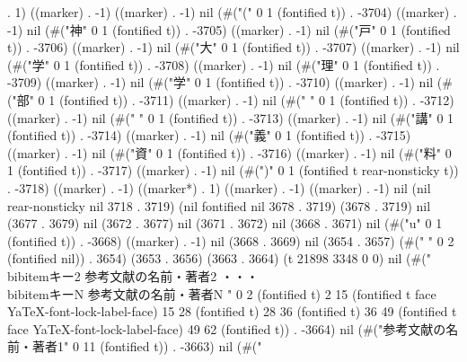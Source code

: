 . 1) ((marker) . -1) ((marker) . -1) nil (#("(" 0 1 (fontified t)) . -3704) ((marker) . -1) nil (#("神" 0 1 (fontified t)) . -3705) ((marker) . -1) nil (#("戸" 0 1 (fontified t)) . -3706) ((marker) . -1) nil (#("大" 0 1 (fontified t)) . -3707) ((marker) . -1) nil (#("学" 0 1 (fontified t)) . -3708) ((marker) . -1) nil (#("理" 0 1 (fontified t)) . -3709) ((marker) . -1) nil (#("学" 0 1 (fontified t)) . -3710) ((marker) . -1) nil (#("部" 0 1 (fontified t)) . -3711) ((marker) . -1) nil (#("
" 0 1 (fontified t)) . -3712) ((marker) . -1) nil (#("	" 0 1 (fontified t)) . -3713) ((marker) . -1) nil (#("講" 0 1 (fontified t)) . -3714) ((marker) . -1) nil (#("義" 0 1 (fontified t)) . -3715) ((marker) . -1) nil (#("資" 0 1 (fontified t)) . -3716) ((marker) . -1) nil (#("料" 0 1 (fontified t)) . -3717) ((marker) . -1) nil (#(")" 0 1 (fontified t rear-nonsticky t)) . -3718) ((marker) . -1) ((marker*) . 1) ((marker) . -1) ((marker) . -1) nil (nil rear-nonsticky nil 3718 . 3719) (nil fontified nil 3678 . 3719) (3678 . 3719) nil (3677 . 3679) nil (3672 . 3677) nil (3671 . 3672) nil (3668 . 3671) nil (#("u" 0 1 (fontified t)) . -3668) ((marker) . -1) nil (3668 . 3669) nil (3654 . 3657) (#("  " 0 2 (fontified nil)) . 3654) (3653 . 3656) (3663 . 3664) (t 21898 3348 0 0) nil (#("  \\bibitem{キー2} 参考文献の名前・著者2
  ・・・
  \\bibitem{キーN} 参考文献の名前・著者N
" 0 2 (fontified t) 2 15 (fontified t face YaTeX-font-lock-label-face) 15 28 (fontified t) 28 36 (fontified t) 36 49 (fontified t face YaTeX-font-lock-label-face) 49 62 (fontified t)) . -3664) nil (#("参考文献の名前・著者1" 0 11 (fontified t)) . -3663) nil (#("
